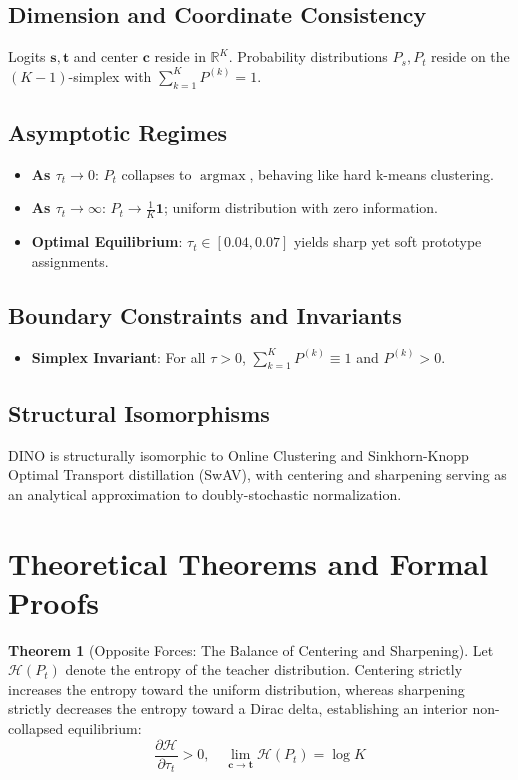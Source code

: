 \documentclass[11pt,a4paper]{article}
\theoremstyle{definition}
\newtheorem{theorem}{\textbf{Theorem}}[section]
\begin{document}
\subsection{Dimension and Coordinate Consistency}
Logits $\mathbf{s}, \mathbf{t}$ and center $\mathbf{c}$ reside in $\mathbb{R}^K$. Probability distributions $P_s, P_t$ reside on the $(K-1)$-simplex with $\sum_{k=1}^K P^{(k)} = 1$.

\subsection{Asymptotic Regimes}
\begin{itemize}
    \item \textbf{As $\tau_t \to 0$}: $P_t$ collapses to $\operatorname{argmax}$, behaving like hard k-means clustering.
    \item \textbf{As $\tau_t \to \infty$}: $P_t \to \frac{1}{K}\mathbf{1}$; uniform distribution with zero information.
    \item \textbf{Optimal Equilibrium}: $\tau_t \in [0.04, 0.07]$ yields sharp yet soft prototype assignments.
\end{itemize}

\subsection{Boundary Constraints and Invariants}
\begin{itemize}
    \item \textbf{Simplex Invariant}: For all $\tau > 0$, $\sum_{k=1}^K P^{(k)} \equiv 1$ and $P^{(k)} > 0$.
\end{itemize}

\subsection{Structural Isomorphisms}
DINO is structurally isomorphic to Online Clustering and Sinkhorn-Knopp Optimal Transport distillation (SwAV), with centering and sharpening serving as an analytical approximation to doubly-stochastic normalization.

\section{Theoretical Theorems and Formal Proofs}

\begin{theorem}[Opposite Forces: The Balance of Centering and Sharpening]
Let $\mathcal{H}(P_t)$ denote the entropy of the teacher distribution. Centering strictly increases the entropy toward the uniform distribution, whereas sharpening strictly decreases the entropy toward a Dirac delta, establishing an interior non-collapsed equilibrium:
{\boldmath
\begin{equation}
\frac{\partial \mathcal{H}}{\partial \tau_t} > 0, \quad \lim_{\mathbf{c} \to \mathbf{t}} \mathcal{H}(P_t) = \log K
\end{equation}
}
\end{theorem}
\end{document}
